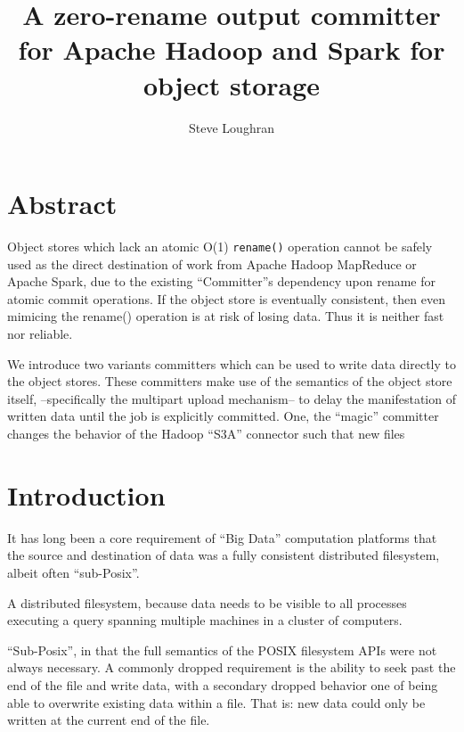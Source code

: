 \documentclass[9pt,technote]{IEEEtran}
\begin{document}
\parindent 0pt
\setlength{\parskip}{3ex}



\title{A zero-rename output committer for Apache Hadoop and Spark for object storage}
\author{Steve Loughran}
\maketitle


\section{Abstract}

Object stores which lack an atomic O(1) \texttt{rename()} operation cannot be safely used as the direct destination of work from Apache Hadoop MapReduce or Apache Spark, due to the existing ``Committer''s dependency upon rename for atomic commit operations. If the object store is eventually consistent, then even mimicing the rename() operation is at risk of losing data. Thus it is neither fast nor reliable.

We introduce two variants committers which can be used to write data directly to the object stores. These committers make use of the semantics of the object store itself, --specifically the multipart upload mechanism-- to delay the manifestation of written data until the job is explicitly committed. One, the ``magic'' committer changes the behavior of the Hadoop ``S3A'' connector such that new files

\section{Introduction}


It has long been a core requirement of ``Big Data'' computation platforms that the source and destination of data was a fully consistent distributed filesystem, albeit often ``sub-Posix''.


A distributed filesystem, because data needs to be visible to all processes executing a query spanning multiple machines in a cluster of computers. 

``Sub-Posix'', in that the full semantics of the POSIX filesystem APIs were not always necessary. A commonly dropped requirement is the ability to seek past the end of the file and write data, with a secondary dropped behavior one of being able to overwrite existing data within a file. That is: new data could only be written at the current end of the file. 
\end{document}
